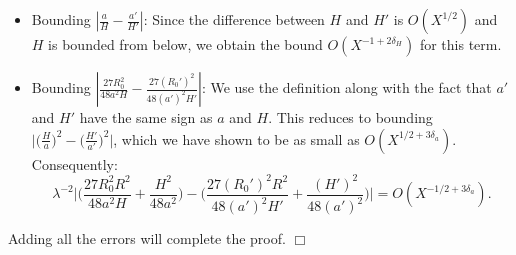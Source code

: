 \documentclass[10pt,a4paper]{amsart}
\newenvironment{proof}{\noindent {\bf Proof:}}{$\Box$ \vspace{2 ex}}
\begin{document}
\begin{proof}
\begin{itemize}
Secondly, we examine
\begin{equation*}
\Big| |a'| |H|^{1/2} \sqrt{X + \frac{H^2}{48a^2}} - |a'| |H'|^{1/2} \sqrt{X + \frac{H^2}{48a^2}} \Big|.
\end{equation*}
This term is $O(X^{1 + \delta_H/2 + 2\delta_a})$ because $H$ and $H'$ have the same sign, and we have the constraints $|H - H'| = O(X^{1/2})$ and $|H| > X^{1 - \delta_H}$. This bound follows directly from these constraints.

Finally, we consider the term
\begin{equation*}
\Big| |a'| |H'|^{1/2} \sqrt{X + \frac{H^2}{48a^2}} - |a'| |H'|^{1/2} \sqrt{X + \frac{(H')^2}{48(a')^2}} \Big|.
\end{equation*}
Our goal is to show that this difference is also small. Using the Mean Value Theorem, we know that $|(H/a)^2 - (H'/a')^2| = O(X^{1/2 + 3\delta_a})$, which implies that this term is bounded by $O(X^{1 + 3\delta_a})$.

In summary, each of the three terms is bounded, resulting in a total error of $O(X^{-1/2 + 3\delta_a+\delta_H+6\delta_t})$ for $|(R_0-R_0')t^6\lambda^{-3}|$.
\item Bounding $ \left| \frac{a}{H} - \frac{a'}{H'} \right|$: Since the difference between $H$ and $H'$ is $O(X^{1/2})$ and $H$ is bounded from below, we obtain the bound $O(X^{-1+2\delta_H})$ for this term.
    
\item Bounding $ \left| \frac{27 R_0^2}{48 a^2 H} - \frac{27 (R_0')^2}{48 (a')^2 H'} \right|$: We use the definition along with the fact that $a'$ and $H'$ have the same sign as $a$ and $H$. This reduces to bounding $ \Big| \Big(\frac{H}{a}\Big)^2 - \Big(\frac{H'}{a'}\Big)^2 \Big|$, which we have shown to be as small as $O(X^{1/2+3\delta_a})$. Consequently:
    \begin{equation*}
        \lambda^{-2} \Big| \Big( \frac{27 R_0^2 R^2}{48 a^2 H} + \frac{H^2}{48 a^2} \Big) - \Big( \frac{27 (R_0')^2 R^2}{48 (a')^2 H'} + \frac{(H')^2}{48 (a')^2} \Big) \Big| = O(X^{-1/2+3\delta_a}).
    \end{equation*}
\end{itemize}
Adding all the errors will complete the proof.
\end{proof}
\end{document}
